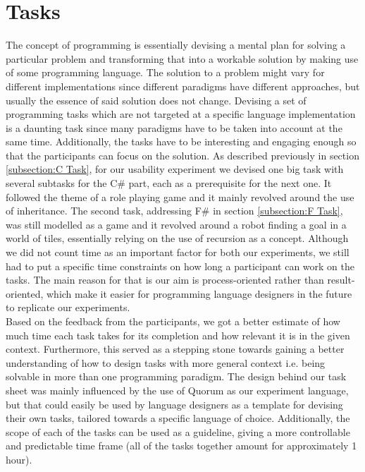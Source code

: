 \section{Tasks}
The concept of programming is essentially devising a mental plan for solving a particular problem and transforming that into a workable solution by making use of some programming language. The solution to a problem might vary for different implementations since different paradigms have different approaches, but usually the essence of said solution does not change. Devising a set of programming tasks which are not targeted at a specific language implementation is a daunting task since many paradigms have to be taken into account at the same time. Additionally, the tasks have to be interesting and engaging enough so that the participants can focus on the solution. As described previously in section \ref{subsection:C Task}, for our usability experiment we devised one big task with several subtasks for the C\# part, each as a prerequisite for the next one. It followed the theme of a role playing game and it mainly revolved around the use of inheritance. The second task, addressing F\# in section \ref{subsection:F Task}, was still modelled as a game and it revolved around a robot finding a goal in a world of tiles, essentially relying on the use of recursion as a concept. Although we did not count time as an important factor for both our experiments, we still had to put a specific time constraints on how long a participant can work on the tasks. The main reason for that is our aim is process-oriented rather than result-oriented, which make it easier for programming language designers in the future to replicate our experiments.\\ Based on the feedback from the participants, we got a better estimate of how much time each task takes for its completion and how relevant it is in the given context. Furthermore, this served as a stepping stone towards gaining a better understanding of how to design tasks with more general context i.e. being solvable in more than one programming paradigm. The design behind our task sheet was mainly influenced by the use of Quorum as our experiment language, but that could easily be used by language designers as a template for devising their own tasks, tailored towards a specific language of choice. Additionally, the scope of each of the tasks  can be used as a guideline, giving a more controllable and predictable time frame (all of the tasks together amount for approximately 1 hour). 

